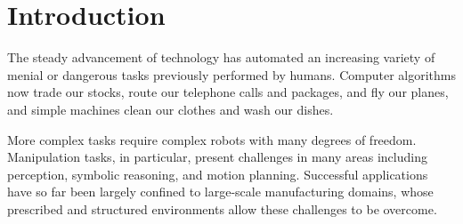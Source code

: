\documentclass{report}
\newlength{\offsetpage}
\newenvironment{widepage}
   {\begin{adjustwidth}{-\offsetpage}{-\offsetpage}%
    \addtolength{\textwidth}{2\offsetpage}}%
{\end{adjustwidth}}
\begin{document}
%      
%      
%      
%      


\newpage
\chapter{Introduction}

The steady advancement of technology
has automated an increasing variety of menial or dangerous tasks
previously performed by humans.
Computer algorithms now trade our stocks,
route our telephone calls and packages,
and fly our planes,
and simple machines clean our clothes and wash our dishes.

More complex tasks require complex robots with many
degrees of freedom.
Manipulation tasks, in particular,
present challenges in many areas including
perception, symbolic reasoning, and motion planning.
Successful applications have so far been largely
confined to large-scale manufacturing domains,
whose prescribed and structured environments
allow these challenges to be overcome.
\end{document}
